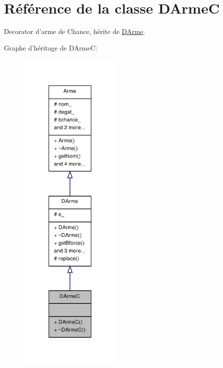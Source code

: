 \hypertarget{class_d_arme_c}{\section{Référence de la classe D\-Arme\-C}
\label{class_d_arme_c}
}


Decorator d'arme de Chance, hérite de \hyperlink{class_d_arme}{D\-Arme}.  




Graphe d'héritage de D\-Arme\-C\-:
\nopagebreak
\begin{figure}[H]
\begin{center}
\leavevmode
\includegraphics[width=144pt]{class_d_arme_c__inherit__graph}
\end{center}
\end{figure}


